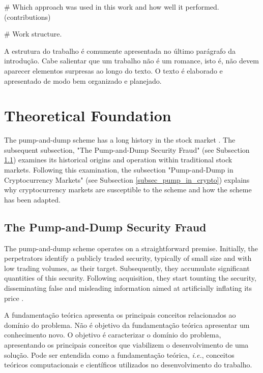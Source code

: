 \documentclass[12pt]{article}
\begin{document}
	

	\# Which approach was used in this work and how well it performed. (contributions)

	\# Work structure.
	
	A estrutura do trabalho é comumente apresentada no último parágrafo da introdução. Cabe salientar que um trabalho não é um romance, isto é, não devem aparecer elementos surpresas ao longo do texto. O texto é elaborado e apresentado de modo bem organizado e planejado. 
	
	\section{Theoretical Foundation}
	\label{sec_fund_teorica}

	The pump-and-dump scheme has a long history in the stock market \citep{lamorgia2020}.
	The subsequent subsection, "The Pump-and-Dump Security Fraud" (see Subsection \ref{subsec_pump_def}) examines its historical origins and operation within traditional stock markets.
	Following this examination, the subsection "Pump-and-Dump in Cryptocurrency Markets" (see Subsection \ref{subsec_pump_in_crypto}) explains why cryptocurrency markets are susceptible to the scheme and how the scheme has been adapted.

	\subsection{The Pump-and-Dump Security Fraud}
	\label{subsec_pump_def}

	The pump-and-dump scheme operates on a straightforward premise.
	Initially, the perpetrators identify a publicly traded security, typically of small size and with low trading volumes, as their target.
	Subsequently, they accumulate significant quantities of this security.
	Following acquisition, they start tounting the security, disseminating false and misleading information aimed at artificially inflating its price \citep{kramer2005}.
	
	A fundamentação teórica apresenta os principais conceitos relacionados ao domínio do problema. Não é objetivo da fundamentação teórica apresentar um conhecimento novo. O objetivo é caracterizar o domínio do problema, apresentando os principais conceitos que viabilizem o desenvolvimento de uma solução. Pode ser entendida como a fundamentação teórica, \emph{i.e.}, conceitos teóricos computacionais e científicos utilizados no desenvolvimento do trabalho.
	
\end{document}
